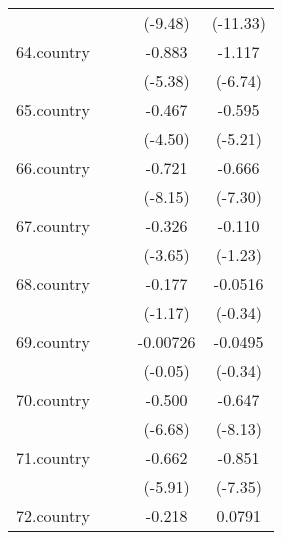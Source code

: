 {\begin{tabular}{l*{4}{c}}
            &                     &                     &     (-9.48)         &    (-11.33)         \\
[1em]
64.country  &                     &                     &      -0.883\sym{***}&      -1.117\sym{***}\\
            &                     &                     &     (-5.38)         &     (-6.74)         \\
[1em]
65.country  &                     &                     &      -0.467\sym{***}&      -0.595\sym{***}\\
            &                     &                     &     (-4.50)         &     (-5.21)         \\
[1em]
66.country  &                     &                     &      -0.721\sym{***}&      -0.666\sym{***}\\
            &                     &                     &     (-8.15)         &     (-7.30)         \\
[1em]
67.country  &                     &                     &      -0.326\sym{***}&      -0.110         \\
            &                     &                     &     (-3.65)         &     (-1.23)         \\
[1em]
68.country  &                     &                     &      -0.177         &     -0.0516         \\
            &                     &                     &     (-1.17)         &     (-0.34)         \\
[1em]
69.country  &                     &                     &    -0.00726         &     -0.0495         \\
            &                     &                     &     (-0.05)         &     (-0.34)         \\
[1em]
70.country  &                     &                     &      -0.500\sym{***}&      -0.647\sym{***}\\
            &                     &                     &     (-6.68)         &     (-8.13)         \\
[1em]
71.country  &                     &                     &      -0.662\sym{***}&      -0.851\sym{***}\\
            &                     &                     &     (-5.91)         &     (-7.35)         \\
[1em]
72.country  &                     &                     &      -0.218\sym{*}  &      0.0791         \\

\end{tabular}}
